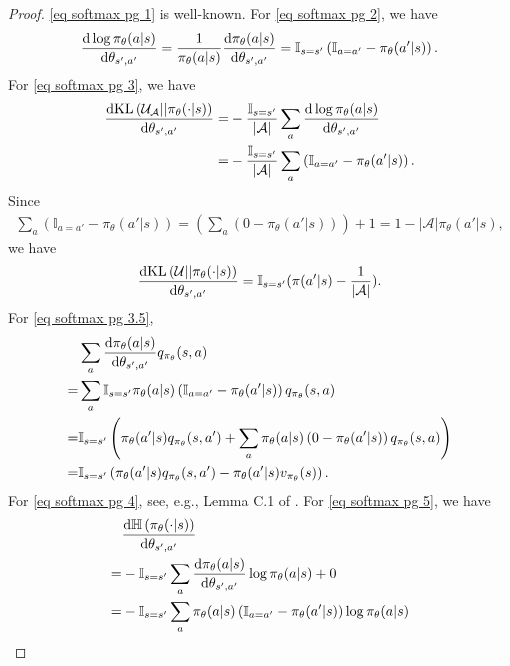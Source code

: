 \documentclass[twoside,11pt]{article}
\newcommand{\fA}{\mathcal{A}}
\newcommand{\fU}{\mathcal{U}}
\newcommand{\na}{{|\fA|}}
\newcommand{\kl}[2]{\text{KL}\left(#1||#2\right)}
\newcommand{\ent}[1]{\mathbb{H}\left(#1\right)}
\numberwithin{assucounter}{section}
\begin{document}
\begin{proof}
  \eqref{eq softmax pg 1} is well-known.
  For \eqref{eq softmax pg 2}, we have
  \begin{align}
    \dv{\log \pi_\theta(a|s)}{\theta_{s', a'}} = \frac{1}{\pi_\theta(a|s)} \dv{\pi_\theta(a|s)}{\theta_{s',a'}} = \mathbb{I}_{s = s'}\left(\mathbb{I}_{a = a'} - \pi_\theta(a' | s)\right).
  \end{align}
  For \eqref{eq softmax pg 3}, we have
  \begin{align}
    \dv{\kl{\fU_\fA}{\pi_\theta(\cdot | s)}}{\theta_{s', a'}} =& - \frac{\mathbb{I}_{s=s'}}{\na} \sum_a \dv{\log \pi_\theta(a|s)}{\theta_{s', a'}}  \\
    =& - \frac{\mathbb{I}_{s=s'}}{\na} \sum_a \left(\mathbb{I}_{a = a'} - \pi_\theta(a' | s)\right).
  \end{align}
  Since
  \begin{align}
    \sum_a \left(\mathbb{I}_{a = a'} - \pi_\theta(a' | s)\right) = \left(\sum_a \left(0 - \pi_\theta(a' | s)\right) \right) + 1 = 1 - \na \pi_{\theta}(a'|s),
  \end{align}
  we have
  \begin{align}
    \dv{\kl{\fU}{\pi_\theta(\cdot | s)}}{\theta_{s', a'}} = \mathbb{I}_{s=s'}(\pi(a' | s) - \frac{1}{\na}).
  \end{align}
  For \eqref{eq softmax pg 3.5},
  \begin{align}
    &\sum_a \dv{\pi_\theta(a|s)}{\theta_{s',a'}} q_{\pi_\theta}(s, a) \\
    =& \sum_a \mathbb{I}_{s=s'} \pi_\theta(a|s) \left(\mathbb{I}_{a = a'} - \pi_\theta(a' | s)\right) q_{\pi_\theta}(s, a) \\
    =& \mathbb{I}_{s=s'} \left(\pi_\theta(a'|s)q_{\pi_\theta}(s, a') + \sum_a \pi_\theta(a|s) \left(0 - \pi_\theta(a' | s)\right) q_{\pi_\theta}(s, a) \right) \\
    =& \mathbb{I}_{s=s'} \left(\pi_\theta(a'|s)q_{\pi_\theta}(s, a') - \pi_\theta(a'|s) v_{\pi_\theta}(s) \right).
  \end{align}
  For \eqref{eq softmax pg 4}, see, e.g., Lemma C.1 of \citet{agarwal2019optimality}. 
  For \eqref{eq softmax pg 5}, we have
  \begin{align}
    &\dv{\ent{\pi_\theta(\cdot |s)}}{\theta_{s', a'}} \\
    =& -\mathbb{I}_{s=s'} \sum_a \dv{\pi_\theta(a|s)}{\theta_{s',a'}} \log \pi_\theta(a|s) + 0 \\
    =& -\mathbb{I}_{s=s'} \sum_a \pi_\theta(a|s) \left(\mathbb{I}_{a = a'} - \pi_\theta(a' | s)\right) \log \pi_\theta(a|s) \\

\end{align}
\end{proof}
\end{document}
